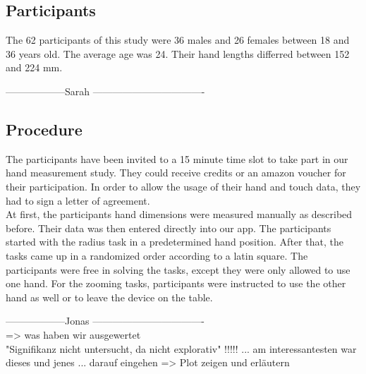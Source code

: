 \documentclass{sigchi}
\begin{document}
\subsection{Participants}
The 62 participants of this study were 36 males and 26 females between 18 and 36 years old. The average age was 24. Their hand lengths differred between 152 and 224 mm.

------------------Sarah ----------------------------------
\subsection{Procedure}
The participants have been invited to a 15 minute time slot to take part in our hand measurement study. They could receive credits or an amazon voucher for their participation. In order to allow the usage of their hand and touch data, they had to sign a letter of agreement.\\
At first, the participants hand dimensions were measured manually as described before. Their data was then entered directly into our app. The participants started with the radius task in a predetermined hand position. After that, the tasks came up in a randomized order according to a latin square. The participants were free in solving the tasks, except they were only allowed to use one hand. For the zooming tasks, participants were instructed to use the other hand as well or to leave the device on the table.

------------------Jonas ----------------------------------\\
=> was haben wir ausgewertet\\
"Signifikanz nicht untersucht, da nicht explorativ" !!!!! ... am interessantesten war dieses und jenes ... darauf eingehen => Plot zeigen und erläutern
\end{document}
